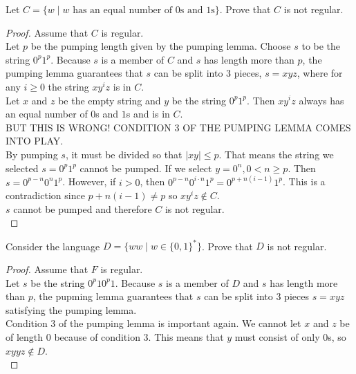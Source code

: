 \documentclass[11pt,a4paper]{article}
\begin{document}
\begin{example}
    Let $C=\{w\mid w\text{ has an equal number of $0$s and $1$s}\}$. Prove that $C$ is not regular.

    \begin{proof}
        Assume that $C$ is regular. \\

        Let $p$ be the pumping length given by the pumping lemma. Choose $s$ to be the string $0^p1^p$.
        Because $s$ is a member of $C$ and $s$ has length more than $p$, the pumping lemma guarantees that $s$ can be split into 3 pieces, $s=xyz$, where for any $i\geq 0$ the string $xy^iz$ is in $C$. \\
        
        Let $x$ and $z$ be the empty string and $y$ be the string $0^p1^p$. Then $xy^iz$ always has an equal number of $0$s and $1$s and is in $C$. \\

        BUT THIS IS WRONG! CONDITION 3 OF THE PUMPING LEMMA COMES INTO PLAY. \\
        
        By pumping $s$, it must be divided so that $|xy|\leq p$. That means the string we selected $s=0^p1^p$ cannot be pumped.
        If we select $y=0^n, 0<n\geq p$. Then $s=0^{p-n}0^n1^p$. However, if $i > 0$, then $0^{p-n}0^{i\cdot n}1^p=0^{p+n(i-1)}1^p$.
        This is a contradiction since $p+n(i-1)\neq p$ so $xy^iz\notin C$. \\

        $s$ cannot be pumped and therefore $C$ is not regular. \\
    \end{proof}
\end{example}

\begin{example}
    Consider the language $D=\{ww\mid w\in\{0,1\}^*\}$. Prove that $D$ is not regular.
    
    \begin{proof}
        Assume that $F$ is regular. \\

        Let $s$ be the string $0^p10^p1$. Because $s$ is a member of $D$ and $s$ has length more than $p$, the pupming lemma guarantees that $s$ can be split into 3 pieces $s=xyz$ satisfying the pumping lemma. \\

        Condition 3 of the pumping lemma is important again. We cannot let $x$ and $z$ be of length 0 because of condition 3.
        This means that $y$ must consist of only $0$s, so $xyyz\notin D$. \\
    \end{proof}
\end{example}
\end{document}
